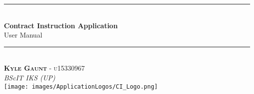 \documentclass[11pt]{article}
\begin{document}
\begin{titlepage}
	\newcommand{\HRule}{\rule{\linewidth}{0.5mm}}
    \begin{center}
    
    	\HRule\\[0.4cm]
    	
    	{\huge\bfseries Contract Instruction Application}\\[0.2cm]
    	
    	{\huge User Manual}\\[0.2cm]

    	\HRule\\[0.5cm]

	    \textsc{\textbf{Kyle Gaunt} - u15330967}\\[0cm]
	    \textit{BScIT IKS (UP)}\\[0.5cm]
        \texttt{[image: images/ApplicationLogos/CI\_Logo.png]}
    
    \end{center}
\end{titlepage}
\tableofcontents
\newpage
\end{document}

